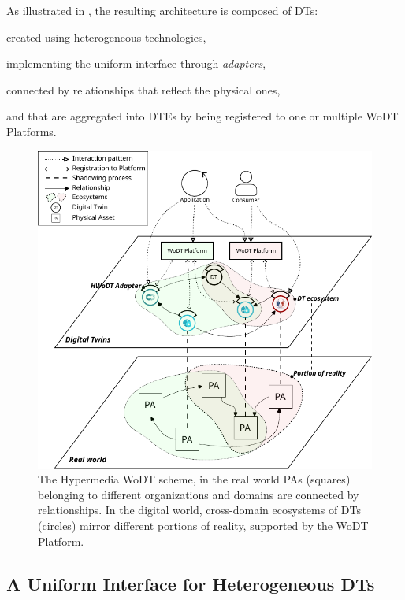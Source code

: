 As illustrated in , the resulting architecture is composed of \acp{DT}:
\begin{inlinelist}
    \item created using heterogeneous technologies,
    \item implementing the uniform interface through \emph{adapters},
    \item connected by relationships that reflect the physical ones,
    \item and that are aggregated into \acp{DTE} by being registered to one or multiple WoDT Platforms.
\end{inlinelist}    

\begin{figure}[t]
  \centering
  \includegraphics[width=0.7\columnwidth]{figures/hwodt/hwodt.pdf}
  \caption{The Hypermedia WoDT scheme, in the real world PAs (squares) belonging to different organizations and domains are connected by relationships. In the digital world, cross-domain ecosystems of DTs (circles) mirror different portions of reality, supported by the WoDT Platform.}
  \label{fig:hwodt}
\end{figure}

\subsection{A Uniform Interface for Heterogeneous DTs}
\label{ssec:uniform-interface}

